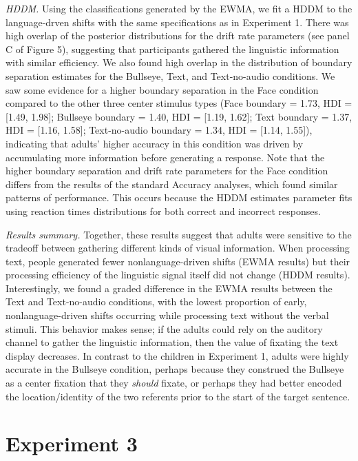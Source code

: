 \documentclass[english,floatsintext,man]{apa6}
\begin{document}
\emph{HDDM.} Using the classifications generated by the EWMA, we fit a
HDDM to the language-drven shifts with the same specifications as in
Experiment 1. There was high overlap of the posterior distributions for
the drift rate parameters (see panel C of Figure 5), suggesting that
participants gathered the linguistic information with similar
efficiency. We also found high overlap in the distribution of boundary
separation estimates for the Bullseye, Text, and Text-no-audio
conditions. We saw some evidence for a higher boundary separation in the
Face condition compared to the other three center stimulus types (Face
boundary = 1.73, HDI = {[}1.49, 1.98{]}; Bullseye boundary = 1.40, HDI =
{[}1.19, 1.62{]}; Text boundary = 1.37, HDI = {[}1.16, 1.58{]};
Text-no-audio boundary = 1.34, HDI = {[}1.14, 1.55{]}), indicating that
adults' higher accuracy in this condition was driven by accumulating
more information before generating a response. Note that the higher
boundary separation and drift rate parameters for the Face condition
differs from the results of the standard Accuracy analyses, which found
similar patterns of performance. This occurs because the HDDM estimates
parameter fits using reaction times distributions for both correct and
incorrect responses.

\emph{Results summary.} Together, these results suggest that adults were
sensitive to the tradeoff between gathering different kinds of visual
information. When processing text, people generated fewer
nonlanguage-driven shifts (EWMA results) but their processing efficiency
of the linguistic signal itself did not change (HDDM results).
Interestingly, we found a graded difference in the EWMA results between
the Text and Text-no-audio conditions, with the lowest proportion of
early, nonlanguage-driven shifts occurring while processing text without
the verbal stimuli. This behavior makes sense; if the adults could rely
on the auditory channel to gather the linguistic information, then the
value of fixating the text display decreases. In contrast to the
children in Experiment 1, adults were highly accurate in the Bullseye
condition, perhaps because they construed the Bullseye as a center
fixation that they \emph{should} fixate, or perhaps they had better
encoded the location/identity of the two referents prior to the start of
the target sentence.

\hypertarget{experiment-3}{%
\section{Experiment 3}\label{experiment-3}}
\end{document}

